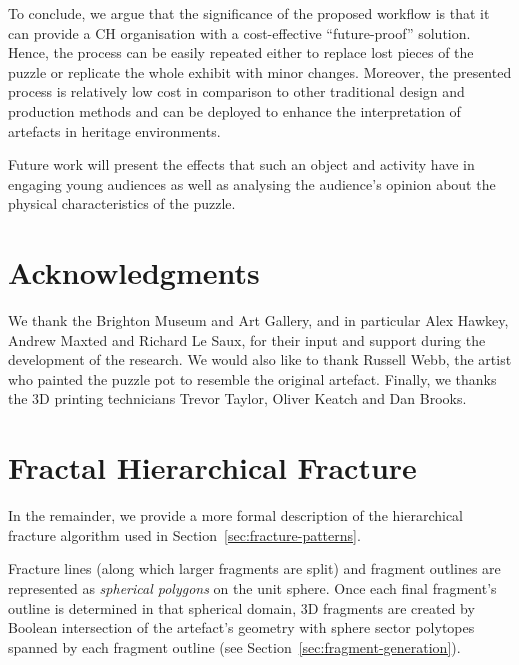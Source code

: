 \documentclass[acmlarge,screen,dvipsnames]{acmart}
\begin{document}



To conclude, we argue that the significance of the proposed workflow
is that it can provide a CH organisation with a cost-effective
``future-proof'' solution. Hence, the process can be easily repeated
either to replace lost pieces of the puzzle or replicate the whole
exhibit with minor changes. Moreover, the presented process is
relatively low cost in comparison to other traditional design and
production methods and can be deployed to enhance the interpretation
of artefacts in heritage environments.

Future work will present the effects that such an object and activity
have in engaging young audiences as well as analysing the
audience's opinion about the physical characteristics of the puzzle.

\section{Acknowledgments}

We thank the Brighton Museum and Art Gallery, and in particular Alex
Hawkey, Andrew Maxted and Richard Le Saux, for their input and support during the
development of the research. We would also like to thank Russell Webb,
the artist who painted the puzzle pot to resemble the original
artefact. Finally, we thanks the 3D printing technicians Trevor Taylor, 
Oliver Keatch and Dan Brooks.

\appendix

\newcommand{\IR}{\RR}

\section{Fractal Hierarchical Fracture}
\label{apx:hierarchical-algo}

In the remainder, we provide a more formal description of the
hierarchical fracture algorithm used in
Section~\ref{sec:fracture-patterns}.

Fracture lines (along which larger fragments are split) and fragment
outlines are represented as \emph{spherical polygons} on the unit
sphere. Once each final fragment's outline is determined in that
spherical domain, 3D fragments are created by Boolean intersection of
the artefact's geometry with sphere sector polytopes spanned by each
fragment outline (see Section~\ref{sec:fragment-generation}).
\end{document}
